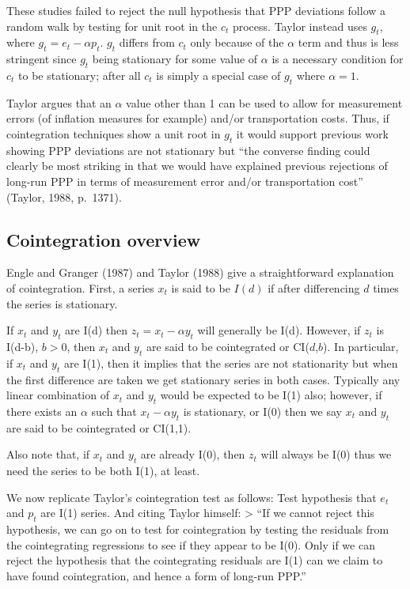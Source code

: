 \documentclass[]{article}
\begin{document}
These studies failed to reject the null hypothesis that PPP deviations follow a random walk by testing for unit root in the \(c_t\) process. Taylor instead uses \(g_t\), where \(g_t = e_t - \alpha p_t\). \(g_t\) differs from \(c_t\) only because of the \(\alpha\) term and thus is less stringent since \(g_t\) being stationary for some value of \(\alpha\) is a necessary condition for \(c_t\) to be stationary; after all \(c_t\) is simply a special case of \(g_t\) where \(\alpha = 1\).

Taylor argues that an \(\alpha\) value other than 1 can be used to allow for measurement errors (of inflation measures for example) and/or transportation costs. Thus, if cointegration techniques show a unit root in \(g_t\) it would support previous work showing PPP deviations are not stationary but ``the converse finding could clearly be most striking in that we would have explained previous rejections of long-run PPP in terms of measurement error and/or transportation cost'' (Taylor, 1988, p.~1371).

\hypertarget{cointegration-overview}{%
\subsection{Cointegration overview}\label{cointegration-overview}}

Engle and Granger (1987) and Taylor (1988) give a straightforward explanation of cointegration. First, a series \(x_t\) is said to be \(I(d)\) if after differencing \(d\) times the series is stationary.

If \(x_t\) and \(y_t\) are I(d) then \(z_t = x_t - \alpha y_t\) will generally be I(d). However, if \(z_t\) is I(d-b), \(b>0\), then \(x_t\) and \(y_t\) are said to be cointegrated or CI(\(d\),\(b\)). In particular, if \(x_t\) and \(y_t\) are I(1), then it implies that the series are not stationarity but when the first difference are taken we get stationary series in both cases. Typically any linear combination of \(x_t\) and \(y_t\) would be expected to be I(1) also; however, if there exists an \(\alpha\) such that \(x_t - \alpha y_t\) is stationary, or I(0) then we say \(x_t\) and \(y_t\) are said to be cointegrated or CI(1,1).

Also note that, if \(x_t\) and \(y_t\) are already I(0), then \(z_t\) will always be I(0) thus we need the series to be both I(1), at least.

We now replicate Taylor's cointegration test as follows: Test hypothesis that \(e_t\) and \(p_t\) are I(1) series. And citing Taylor himself:
\textgreater{} ``If we cannot reject this hypothesis, we can go on to test for cointegration by testing the residuals from the cointegrating regressions to see if they appear to be I(0). Only if we can reject the hypothesis that the cointegrating residuals are I(1) can we claim to have found cointegration, and hence a form of long-run PPP.''
\end{document}
